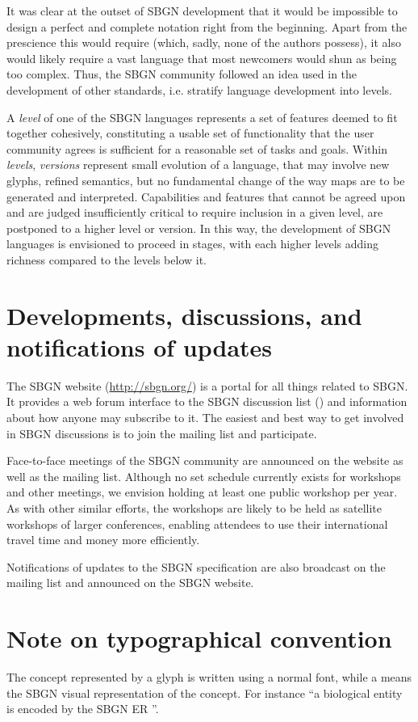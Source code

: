 It was clear at the outset of SBGN development that it would be impossible to design a perfect and complete notation right from the beginning.  Apart from the prescience this would require (which, sadly, none of the authors possess), it also would likely require a vast language that most newcomers would shun as being too complex.  Thus, the SBGN community followed an idea used in the development of other standards, i.e. stratify language development into levels.

A \emph{level} of one of the SBGN languages represents a set of features deemed to fit together cohesively, constituting a usable set of functionality that the user community agrees is sufficient for a reasonable set of tasks and goals.  Within \emph{levels}, \emph{versions} represent small evolution of a language, that may involve new glyphs, refined semantics, but no fundamental change of the way maps are to be generated and interpreted. Capabilities and features that cannot be agreed upon and are judged insufficiently critical to require inclusion in a given level, are postponed to a higher level or version.  In this way, the development of SBGN languages is envisioned to proceed in stages, with each higher levels adding richness compared to the levels below it.

\section{Developments, discussions, and notifications of updates}
\label{sec:discussions}

The SBGN website (\url{http://sbgn.org/}) is a portal for all things related to SBGN.  It provides a web forum interface to the SBGN discussion list () and information about how anyone may subscribe to it.  The easiest and best way to get involved in SBGN discussions is to join the mailing list and participate.

Face-to-face meetings of the SBGN community are announced on the website as well as the mailing list.  Although no set schedule currently exists for workshops and other meetings, we envision holding at least one public workshop per year.  As with other similar efforts, the workshops are likely to be held as satellite workshops of larger conferences, enabling attendees to use their international travel time and money more efficiently.

Notifications of updates to the SBGN specification are also broadcast on the mailing list and announced on the SBGN website.

\section{Note on typographical convention}
The concept represented by a glyph is written using a normal font, while a  means the SBGN visual representation of the concept. For instance ``a biological entity is encoded by the SBGN ER ''. 
